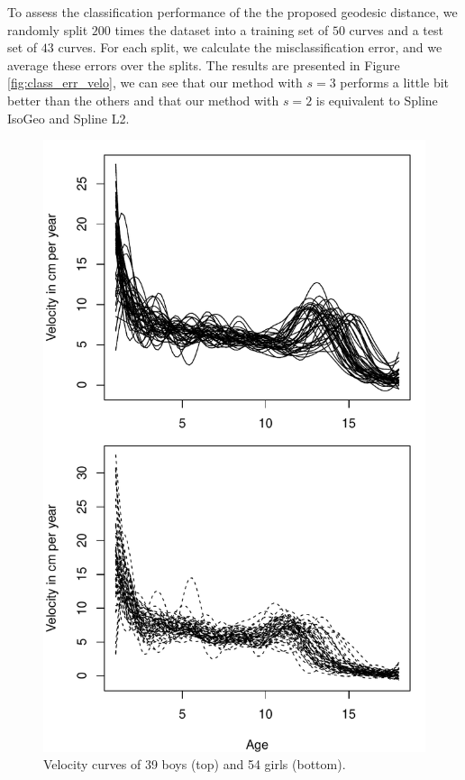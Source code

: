 To assess the classification performance of the the proposed geodesic distance, we randomly split $200$ times the dataset into a training set of $50$ curves and a test set of $43$ curves. For each split, we calculate the misclassification error, and we average these errors over the splits. The results are presented in Figure \ref{fig:class_err_velo}, we can see that our method with $s=3$ performs a little bit better than the others and that our method with $s=2$ is equivalent to Spline IsoGeo and Spline L2.

\begin{figure}[t]
\centering
\includegraphics[height=0.5\textheight]{./Velocity_curves_data_illustration.pdf}
\caption{Velocity curves of 39 boys (top) and 54 girls (bottom).}
\label{fig:data_illu}
\end{figure}

